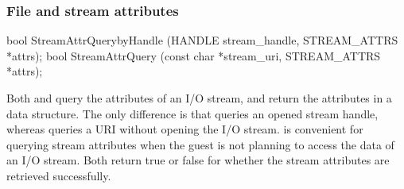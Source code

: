 








\subsubsection*{File and stream attributes}


\begin{paldef}
bool StreamAttrQuerybyHandle (HANDLE stream_handle,
                              STREAM_ATTRS *attrs);
bool StreamAttrQuery (const char *stream_uri, STREAM_ATTRS *attrs);

\end{paldef}

Both  and  query the attributes of an I/O stream, and return the attributes in a  data structure.
The only difference is that  queries an opened stream handle,
whereas  queries a URI without opening the I/O stream.
 is convenient for querying stream attributes when the guest is not planning to access the data of an I/O stream.
Both \hostapis{} return true or false for whether the stream attributes are retrieved successfully.



